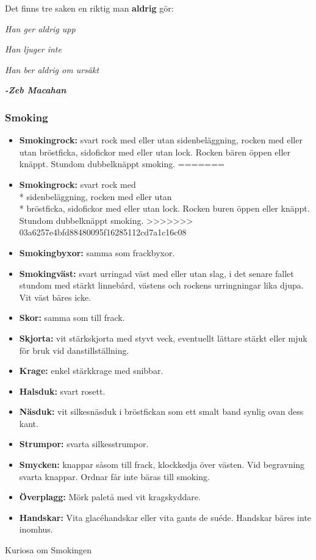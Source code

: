 Det finns tre saken en riktig man \textbf{aldrig} gör:

\textit{Han ger aldrig upp}

\textit{Han ljuger inte}

\textit{Han ber aldrig om ursäkt}

\textit{\textbf{-Zeb Macahan}}

\subsubsection*{\textbf{Smoking}}

\begin{itemize}

<<<<<<< HEAD
    \item[]\textbf{Smokingrock:} svart rock med eller utan sidenbeläggning, rocken med eller utan bröstficka, sidofickor med eller utan lock. Rocken bären öppen eller knäppt. Stundom dubbelknäppt smoking.
=======
    \item[]\textbf{Smokingrock:} svart rock med\\* sidenbeläggning, rocken med eller utan\\* bröstficka, sidofickor med eller utan lock. Rocken buren öppen eller knäppt. Stundom dubbelknäppt smoking.
>>>>>>> 03a6257e4bfd88480095f16285112cd7a1c16c08

    \item[]\textbf{Smokingbyxor:} samma som frackbyxor.

    \item[]\textbf{Smokingväst:} svart urringad väst med eller utan slag, i det senare fallet stundom med stärkt linnebård, västens och rockens urringningar lika djupa. Vit väst bäres icke.

    \item[]\textbf{Skor:} samma som till frack.

    \item[]\textbf{Skjorta:} vit stärkskjorta med styvt veck, eventuellt lättare stärkt eller mjuk för bruk vid danstillställning.

    \item[]\textbf{Krage:} enkel stärkkrage med snibbar.

    \item[]\textbf{Halsduk:} svart rosett.

    \item[]\textbf{Näsduk:} vit silkesnäsduk i bröstfickan som ett smalt band synlig ovan dess kant.

    \item[]\textbf{Strumpor:} svarta silkesstrumpor.

    \item[]\textbf{Smycken:} knappar såsom till frack, klockkedja över västen. Vid begravning svarta knappar. Ordnar får inte bäras till smoking.

    \item[]\textbf{Överplagg:} Mörk paletå med vit kragskyddare.

    \item[]\textbf{Handskar:} Vita glacéhandskar eller vita gants de suéde. Handskar bäres inte inomhus.

\end{itemize}
Kuriosa om Smokingen

